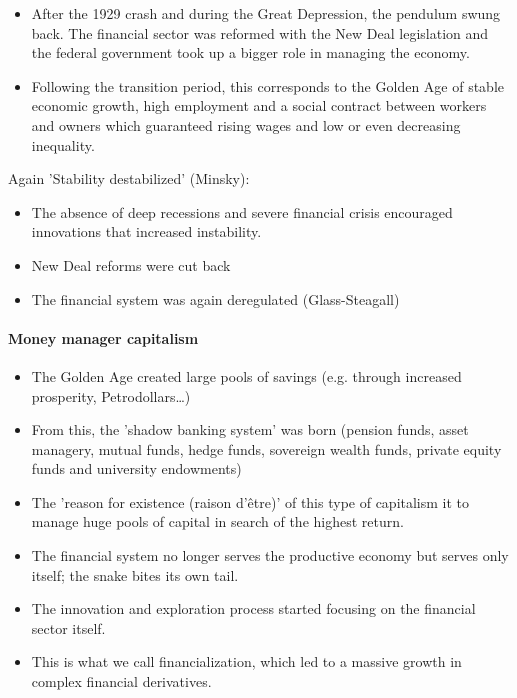 \begin{itemize}
    \item After the 1929 crash and during the Great Depression, the
        pendulum swung back. The financial sector was reformed with
        the New Deal legislation and the federal government took up
        a bigger role in managing the economy.
    \item Following the transition period, this corresponds to the Golden
        Age of stable economic growth, high employment and a social
        contract between workers and owners which guaranteed rising
        wages and low or even decreasing inequality.
\end{itemize}

Again 'Stability destabilized' (Minsky):
\begin{itemize}
    \item The absence of deep recessions and severe financial crisis
        encouraged innovations that increased instability.
    \item New Deal reforms were cut back
    \item The financial system was again deregulated (Glass-Steagall)
\end{itemize}

\paragraph{Money manager capitalism}

\begin{itemize}
    \item The Golden Age created large pools of savings (e.g. through
        increased prosperity, Petrodollars\dots)
    \item From this, the 'shadow banking system' was born (pension funds,
        asset managery, mutual funds, hedge funds, sovereign wealth funds,
        private equity funds and university endowments)
    \item The 'reason for existence (raison d'être)' of this type of capitalism
        it to manage huge pools of capital in search of the highest return.
    \item The financial system no longer serves the productive economy but
        serves only itself; the snake bites its own tail.
    \item The innovation and exploration process started focusing on the
        financial sector itself.
    \item This is what we call financialization, which led to a massive
        growth in complex financial derivatives.
\end{itemize}


